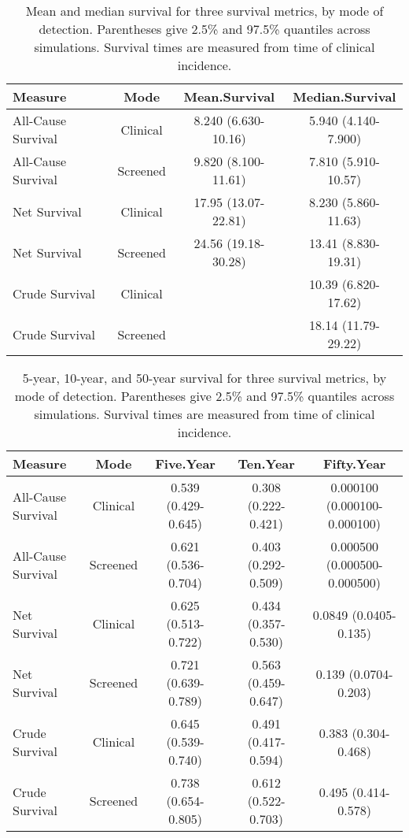 \documentclass[11pt]{article}
\begin{document}
\begin{table}[!ht]
\centering
\begin{tabular}{lccc}
  \hline
Measure & Mode & Mean.Survival & Median.Survival \\ 
  \hline
All-Cause Survival & Clinical & 8.240 (6.630-10.16) & 5.940 (4.140-7.900) \\ 
  All-Cause Survival & Screened & 9.820 (8.100-11.61) & 7.810 (5.910-10.57) \\ 
  Net Survival & Clinical & 17.95 (13.07-22.81) & 8.230 (5.860-11.63) \\ 
  Net Survival & Screened & 24.56 (19.18-30.28) & 13.41 (8.830-19.31) \\ 
  Crude Survival & Clinical &  & 10.39 (6.820-17.62) \\ 
  Crude Survival & Screened &  & 18.14 (11.79-29.22) \\ 
   \hline
\end{tabular}
\caption{Mean and  median survival for three survival metrics, by mode of detection. Parentheses give 2.5\% and 97.5\% quantiles across simulations. Survival times are measured from time of clinical incidence.} 
\label{tab:mmsurv}
\end{table}
\begin{table}[!ht]
\centering
\begin{tabular}{lcccc}
  \hline
Measure & Mode & Five.Year & Ten.Year & Fifty.Year \\ 
  \hline
All-Cause Survival & Clinical & 0.539 (0.429-0.645) & 0.308 (0.222-0.421) & 0.000100 (0.000100-0.000100) \\ 
  All-Cause Survival & Screened & 0.621 (0.536-0.704) & 0.403 (0.292-0.509) & 0.000500 (0.000500-0.000500) \\ 
  Net Survival & Clinical & 0.625 (0.513-0.722) & 0.434 (0.357-0.530) & 0.0849 (0.0405-0.135) \\ 
  Net Survival & Screened & 0.721 (0.639-0.789) & 0.563 (0.459-0.647) & 0.139 (0.0704-0.203) \\ 
  Crude Survival & Clinical & 0.645 (0.539-0.740) & 0.491 (0.417-0.594) & 0.383 (0.304-0.468) \\ 
  Crude Survival & Screened & 0.738 (0.654-0.805) & 0.612 (0.522-0.703) & 0.495 (0.414-0.578) \\ 
   \hline
\end{tabular}
\caption{5-year, 10-year, and 50-year survival for three survival metrics, by mode of detection. Parentheses give 2.5\% and 97.5\% quantiles across simulations. Survival times are measured from time of clinical incidence.} 
\label{tab:ksurv}
\end{table}
\end{document}
